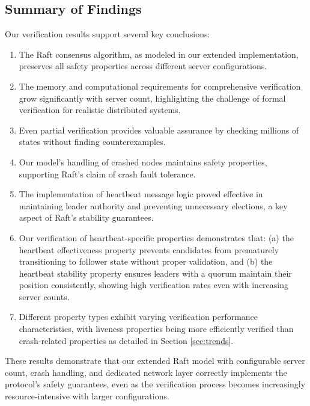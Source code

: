\subsection{Summary of Findings}
\label{sec:findings}
Our verification results support several key conclusions:
\begin{enumerate}
    \item The Raft consensus algorithm, as modeled in our extended implementation, preserves all safety properties across different server configurations.
    
    \item The memory and computational requirements for comprehensive verification grow significantly with server count, highlighting the challenge of formal verification for realistic distributed systems.
    
    \item Even partial verification provides valuable assurance by checking millions of states without finding counterexamples.
    
    \item Our model's handling of crashed nodes maintains safety properties, supporting Raft's claim of crash fault tolerance.
    
    \item The implementation of heartbeat message logic proved effective in maintaining leader authority and preventing unnecessary elections, a key aspect of Raft's stability guarantees.
    
    \item Our verification of heartbeat-specific properties demonstrates that: (a) the heartbeat effectiveness property prevents candidates from prematurely transitioning to follower state without proper validation, and (b) the heartbeat stability property ensures leaders with a quorum maintain their position consistently, showing high verification rates even with increasing server counts.

    \item Different property types exhibit varying verification performance characteristics, with liveness properties being more efficiently verified than crash-related properties as detailed in Section \ref{sec:trends}.
\end{enumerate}

These results demonstrate that our extended Raft model with configurable server count, crash handling, and dedicated network layer correctly implements the protocol's safety guarantees, even as the verification process becomes increasingly resource-intensive with larger configurations.

